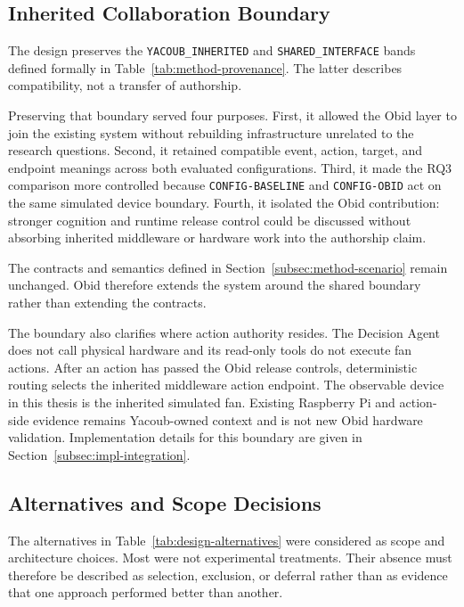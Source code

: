 \subsection{Inherited Collaboration Boundary}\label{subsec:design-boundary}

The design preserves the \mbox{\texttt{YACOUB\_INHERITED}} and
\mbox{\texttt{SHARED\_INTERFACE}} bands defined formally in
Table~\ref{tab:method-provenance}. The latter describes compatibility, not a
transfer of authorship.

Preserving that boundary served four purposes. First, it allowed the Obid layer
to join the existing system without rebuilding infrastructure unrelated to the
research questions. Second, it retained compatible event, action, target, and
endpoint meanings across both evaluated configurations. Third, it made the RQ3
comparison more controlled because \texttt{CONFIG-BASELINE} and
\texttt{CONFIG-OBID} act on the same simulated device boundary. Fourth, it
isolated the Obid contribution: stronger cognition and runtime release control
could be discussed without absorbing inherited middleware or hardware work into
the authorship claim.

The contracts and semantics defined in
Section~\ref{subsec:method-scenario} remain unchanged. Obid therefore extends
the system around the shared boundary rather than extending the contracts.

The boundary also clarifies where action authority resides. The Decision Agent
does not call physical hardware and its read-only tools do not execute fan
actions. After an action has passed the Obid release controls, deterministic
routing selects the inherited middleware action endpoint. The observable device
in this thesis is the inherited simulated fan. Existing Raspberry Pi and
action-side evidence remains Yacoub-owned context and is not new Obid hardware
validation. Implementation details for this boundary are given in
Section~\ref{subsec:impl-integration}.

\subsection{Alternatives and Scope Decisions}\label{subsec:design-alternatives}

The alternatives in Table~\ref{tab:design-alternatives} were considered as
scope and architecture choices. Most were not experimental treatments. Their
absence must therefore be described as selection, exclusion, or deferral rather
than as evidence that one approach performed better than another.

